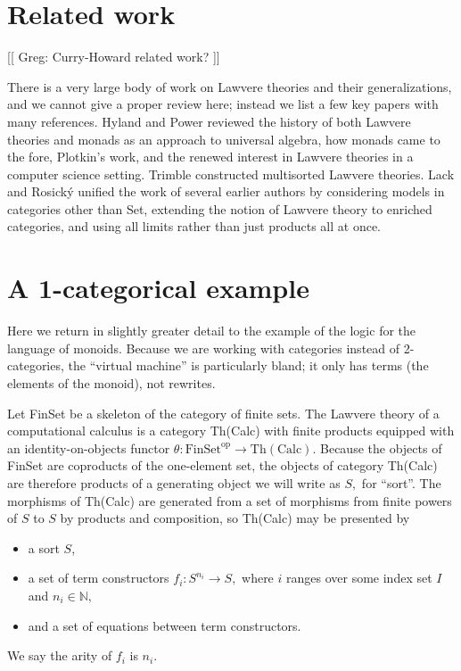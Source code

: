 \documentclass{llncs}
\newcommand{\maps}{\colon}
\newcommand{\FinSet}{\mathrm{FinSet}}
\newcommand{\op}{\mathrm{op}}
\newcommand{\NN}{\mathbb{N}}
\begin{document}
\section{Related work}
[[ Greg: Curry-Howard related work? ]]

There is a very large body of work on Lawvere theories and their generalizations, and we cannot give a proper review here; instead we list a few key papers with many references.  Hyland and Power \cite{DBLP:journals/entcs/HylandP07} reviewed the history of both Lawvere theories and monads as an approach to universal algebra, how monads came to the fore, Plotkin's work, and the renewed interest in Lawvere theories in a computer science setting.  Trimble \cite{Trimble} constructed multisorted Lawvere theories.  Lack and Rosick\'y \cite{DBLP:journals/acs/LackR11} unified the work of several earlier authors by considering models in categories other than Set, extending the notion of Lawvere theory to enriched categories, and using all limits rather than just products all at once.

\section{A 1-categorical example}

Here we return in slightly greater detail to the example of the logic for the language of monoids.  Because we are working with categories instead of 2-categories, the ``virtual machine'' is particularly bland; it only has terms (the elements of the monoid), not rewrites.

Let FinSet be a skeleton of the category of finite sets.  The Lawvere theory of a computational calculus is a category Th(Calc) with finite products equipped with an identity-on-objects functor $\theta\maps \FinSet^\op \to \mathrm{Th(Calc)}.$  Because the objects of FinSet are coproducts of the one-element set, the objects of category Th(Calc) are therefore products of a generating object we will write as $S,$ for ``sort''.  The morphisms of Th(Calc) are generated from a set of morphisms from finite powers of $S$ to $S$ by products and composition, so Th(Calc) may be presented by 
\begin{itemize}
  \item a sort $S$,
  \item a set of term constructors $f_i\maps S^{n_i} \to S,$ where $i$ ranges over some index set $I$ and $n_i \in \NN,$
  \item and a set of equations between term constructors.
\end{itemize}
We say the arity of $f_i$ is $n_i.$
\end{document}
